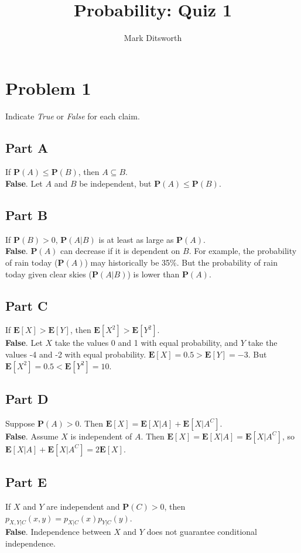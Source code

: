\documentclass{amsart}
\title{Probability: Quiz 1}
\author{Mark Ditsworth}
\begin{document}
	\maketitle
	\section{Problem 1}
	Indicate  \textit{True} or \textit{False} for each claim.
	\subsection{Part A}
	If $\mathbf{P}(A) \leq \mathbf{P}(B)$, then $A \subseteq B$.\\
	\textbf{False}. Let $A$ and $B$ be independent, but $\mathbf{P}(A) \leq \mathbf{P}(B)$.
	\\
	\subsection{Part B}
	If $\mathbf{P}(B) > 0$, $\mathbf{P}(A|B)$ is at least as large as $\mathbf{P}(A)$.\\
	\textbf{False}. $\mathbf{P}(A)$ can decrease if it is dependent on $B$. For example, the probability of rain today ($\mathbf{P}(A)$) may historically be 35\%. But the probability of rain today given clear skies ($\mathbf{P}(A|B)$) is lower than $\mathbf{P}(A)$.\\
	\subsection{Part C}
	If $\mathbf{E}[X] > \mathbf{E}[Y]$, then $\mathbf{E}[X^2] > \mathbf{E}[Y^2]$.\\
	\textbf{False}. Let $X$ take the values 0 and 1 with equal probability, and $Y$ take the values -4 and -2 with equal probability. $\mathbf{E}[X]=0.5 > \mathbf{E}[Y] = -3$. But $\mathbf{E}[X^2]=0.5 < \mathbf{E}[Y^2] = 10$.\\
	\subsection{Part D}
	Suppose $\mathbf{P}(A) > 0$. Then $\mathbf{E}[X] = \mathbf{E}[X|A]+ \mathbf{E}[X|A^C]$.\\
	\textbf{False}. Assume $X$ is independent of $A$. Then $\mathbf{E}[X]=\mathbf{E}[X|A]= \mathbf{E}[X|A^C]$, so $\mathbf{E}[X|A]+ \mathbf{E}[X|A^C] = 2\mathbf{E}[X]$.\\
	\subsection{Part E}
	If $X$ and $Y$ are independent and $\mathbf{P}(C)>0$, then $p_{X,Y|C}(x,y) = p_{X|C}(x)p_{Y|C}(y)$.\\
	\textbf{False}. Independence between $X$ and $Y$ does not guarantee conditional independence.\\
\end{document}
